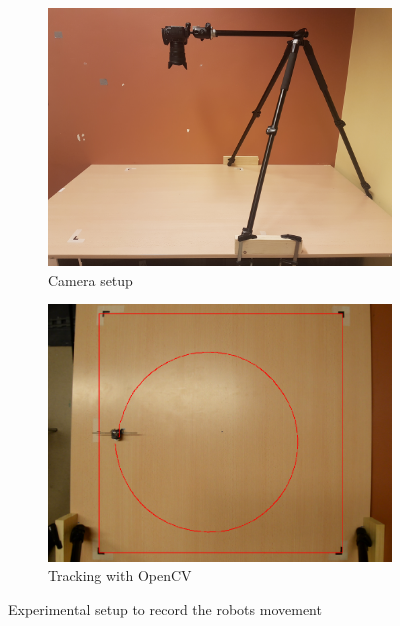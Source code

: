\begin{figure}
	\centering
	\begin{subfigure}[b]{0.45\textwidth}
		\includegraphics[width=\textwidth]{pics/movement_setup.jpg}
		\caption{Camera setup}
		\label{fig:movement_setup}
	\end{subfigure}
	\quad
	\begin{subfigure}[b]{0.45\textwidth}
		\includegraphics[width=\textwidth]{pics/movement_example.png}
		\caption{Tracking with OpenCV}
		\label{fig:movement_example}
	\end{subfigure}
	\caption{Experimental setup to record the robots movement}
\end{figure}

